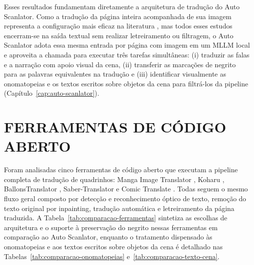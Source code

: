 \documentclass[
    12pt,
    openright,
    oneside,
    a4paper,
    chapter=TITLE,
    section=TITLE,
    english,
    brazilian,
    brazil
]{abntex2}
\begin{document}
Esses resultados fundamentam diretamente a arquitetura de tradução do Auto Scanlator. Como a tradução da página inteira acompanhada de sua imagem representa a configuração mais eficaz na literatura \cite{lippmann-etal-2025-context}, mas todos esses estudos encerram-se na saída textual sem realizar letreiramento ou filtragem, o Auto Scanlator adota essa mesma entrada por página com imagem em um MLLM local e aproveita a chamada para executar três tarefas simultâneas: (i) traduzir as falas e a narração com apoio visual da cena, (ii) transferir as marcações de negrito para as palavras equivalentes na tradução e (iii) identificar visualmente as onomatopeias e os textos escritos sobre objetos da cena para filtrá-los da pipeline (Capítulo~\ref{cap:auto-scanlator}).

\section{FERRAMENTAS DE CÓDIGO ABERTO}
\label{sec:ferramentas}

Foram analisadas cinco ferramentas de código aberto que executam a pipeline completa de tradução de quadrinhos: Manga Image Translator \cite{mangaimagetranslator}, Koharu \cite{koharu}, BallonsTranslator \cite{ballonstranslator}, Saber-Translator \cite{sabertranslator} e Comic Translate \cite{comictranslate}. Todas seguem o mesmo fluxo geral composto por detecção e reconhecimento óptico de texto, remoção do texto original por inpainting, tradução automática e letreiramento da página traduzida. A Tabela~\ref{tab:comparacao-ferramentas} sintetiza as escolhas de arquitetura e o suporte à preservação do negrito nessas ferramentas em comparação ao Auto Scanlator, enquanto o tratamento dispensado às onomatopeias e aos textos escritos sobre objetos da cena é detalhado nas Tabelas~\ref{tab:comparacao-onomatopeias} e~\ref{tab:comparacao-texto-cena}.
\end{document}
